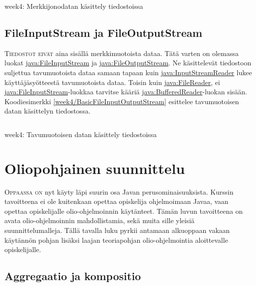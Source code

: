 \documentclass[openany]{book}
\newcommand{\newthought}[1]{\smallskip\textsc{#1}}
\newcommand{\java}[1]{\underline{\gls{java:#1}}}
\newcommand{\code}[3]{
	\begin{listing}
		\linespread{0.85}
		\inputminted{java}{OhjelmointiopasEsimerkit/src/#1/#2.java}
		\caption{#1: #3}
		\label{#1/#2}
	\end{listing}
}
\begin{document}
\code{week4}{BasicFileWriterReader}{Merkkijonodatan käsittely tiedostoissa}


\section{FileInputStream ja FileOutputStream}
\label{tiedostostreameista}

\newthought{Tiedostot eivät} aina sisällä merkkimuotoista dataa. Tätä varten on olemassa luokat
\java{FileInputStream} ja \java{FileOutputStream}. Ne käsittelevät tiedostoon suljettua
tavumuotoista dataa samaan tapaan kuin \java{InputStreamReader} lukee käyttäjäsyötteestä
tavumuotoista dataa. Toisin kuin \java{FileReader}, ei \java{FileInputStream}-luokkaa tarvitse
kääriä \java{BufferedReader}-luokan sisään. Koodiesimerkki \ref{week4/BasicFileInputOutputStream}
esittelee tavumuotoisen datan käsittelyn tiedostossa.

\code{week4}{BasicFileInputOutputStream}{Tavumuotoisen datan käsittely tiedostoissa}


\chapter{Oliopohjainen suunnittelu}
\label{suunnittelusta}

\newthought{Oppaassa on} nyt käyty läpi suurin osa Javan perusominaisuuksista. Kurssin tavoitteena
ei ole kuitenkaan opettaa opiskelija ohjelmoimaan Javaa, vaan opettaa opiskelijalle
olio-ohjelmoinnin käytänteet. Tämän luvun tavoitteena on avata olio-ohjelmoinnin mahdollistamia,
sekä muita sille yleisiä suunnittelumalleja. Tällä tavalla luku pyrkii antamaan alkuoppaan vakaan
käytännön pohjan lisäksi laajan teoriapohjan olio-ohjelmointia aloittevalle opiskelijalle.


\section{Aggregaatio ja kompositio}
\label{aggregaatiokompositio}
\end{document}
